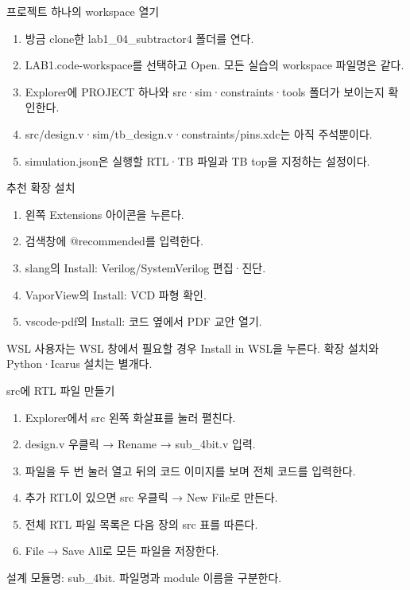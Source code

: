 \begin{frame}{프로젝트 하나의 workspace 열기}\relax
\small
\begin{enumerate}\setlength{\itemsep}{0.22cm}
\item 방금 clone한 lab1\_04\_subtractor4 폴더를 연다.
\item LAB1.code-workspace를 선택하고 Open. 모든 실습의 workspace 파일명은 같다.
\item Explorer에 PROJECT 하나와 src·sim·constraints·tools 폴더가 보이는지 확인한다.
\item src/design.v·sim/tb\_design.v·constraints/pins.xdc는 아직 주석뿐이다.
\item simulation.json은 실행할 RTL·TB 파일과 TB top을 지정하는 설정이다.
\end{enumerate}

\end{frame}

\begin{frame}{추천 확장 설치}\relax
\small
\begin{enumerate}\setlength{\itemsep}{0.22cm}
\item 왼쪽 Extensions 아이콘을 누른다.
\item 검색창에 @recommended를 입력한다.
\item slang의 Install: Verilog/SystemVerilog 편집·진단.
\item VaporView의 Install: VCD 파형 확인.
\item vscode-pdf의 Install: 코드 옆에서 PDF 교안 열기.
\end{enumerate}
WSL 사용자는 WSL 창에서 필요할 경우 Install in WSL을 누른다. 확장 설치와 Python·Icarus 설치는 별개다.\par
\end{frame}

\begin{frame}{src에 RTL 파일 만들기}\relax
\small
\begin{enumerate}\setlength{\itemsep}{0.22cm}
\item Explorer에서 src 왼쪽 화살표를 눌러 펼친다.
\item design.v 우클릭 → Rename → sub\_4bit.v 입력.
\item 파일을 두 번 눌러 열고 뒤의 코드 이미지를 보며 전체 코드를 입력한다.
\item 추가 RTL이 있으면 src 우클릭 → New File로 만든다.
\item 전체 RTL 파일 목록은 다음 장의 src 표를 따른다.
\item File → Save All로 모든 파일을 저장한다.
\end{enumerate}
설계 모듈명: sub\_4bit. 파일명과 module 이름을 구분한다.\par
\end{frame}

